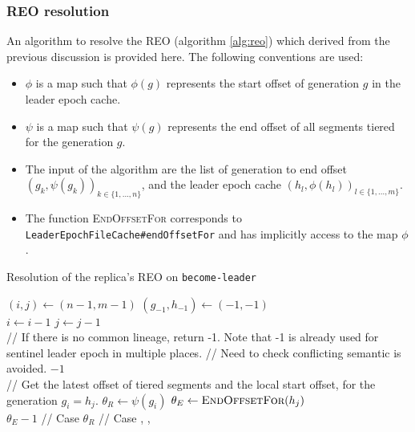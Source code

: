 \documentclass{article}
\newcommand*\circled[1]{\tikz[baseline=(char.base)]{
		\node[shape=circle,draw,inner sep=1pt] (char) {#1};}}
\begin{document}
\subsubsection{REO resolution}

An algorithm to resolve the REO (algorithm \ref{alg:reo}) which derived from the previous discussion is provided here. The following conventions are used:

\begin{itemize}
	\item $\phi$ is a map such that $\phi(g)$ represents the start offset of generation $g$ in the leader epoch cache.
	\item $\psi$ is a map such that $\psi(g)$ represents the end offset of all segments tiered for the generation $g$.
	\item The input of the algorithm are the list of generation to end offset $(g_k, \psi(g_k))_{k \in \{1,...,n\}}$, and the leader epoch cache $(h_l, \phi(h_l))_{l \in \{1,...,m\}}$.
	\item The function \textsc{EndOffsetFor} corresponds to \texttt{LeaderEpochFileCache\#endOffsetFor} and has implicitly access to the map $\phi$.
\end{itemize} 

\begin{algorithm}[h!]
	\caption{Resolution of the replica's REO on \texttt{become-leader}}
	\label{alg:reo}
	
	\begin{algorithmic}[1]
			\State	$(i,j) \leftarrow (n-1,m-1)$
			\State	$(g_{-1}, h_{-1}) \leftarrow (-1,-1)$
			\\
					\State $i \leftarrow i - 1$
				\EndWhile
					\State $j \leftarrow j - 1$
				\EndWhile
			\EndWhile
			\\
			\State // If there is no common lineage, return -1. Note that -1 is already used for sentinel leader epoch in multiple places.
			\State // Need to check conflicting semantic is avoided.
				\State \Return $-1$
			\EndIf
			\\
			\State // Get the latest offset of tiered segments and the local start offset, for the generation $g_i = h_j$.
			\State $\theta_R \leftarrow \psi(g_i)$
			\State $\theta_E \leftarrow  \textsc{EndOffsetFor}(h_j)$
			\\
			\State \Return $\theta_E - 1$ // Case \circled{C}
			\Else
			\State \Return $\theta_R$ // Case \circled{A}, \circled{B}, \circled{D}
			\EndIf
			\\
		\EndFunction
	\end{algorithmic}	
\end{algorithm}
\end{document}

